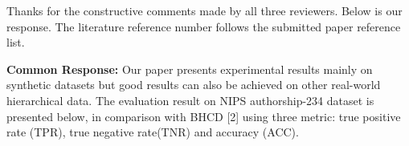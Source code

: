 \documentclass{article}
\begin{document}
Thanks for the constructive comments made by all three reviewers.
Below is our response. The literature reference number follows the submitted paper reference list. 

\textbf{Common Response:}
Our paper presents experimental results mainly on synthetic datasets but good results can also be achieved on other real-world hierarchical data. The evaluation result on NIPS authorship-234 dataset is presented below, in comparison with BHCD [2] using three metric: true positive rate (TPR), true negative rate(TNR) and accuracy (ACC). 
\end{document}
